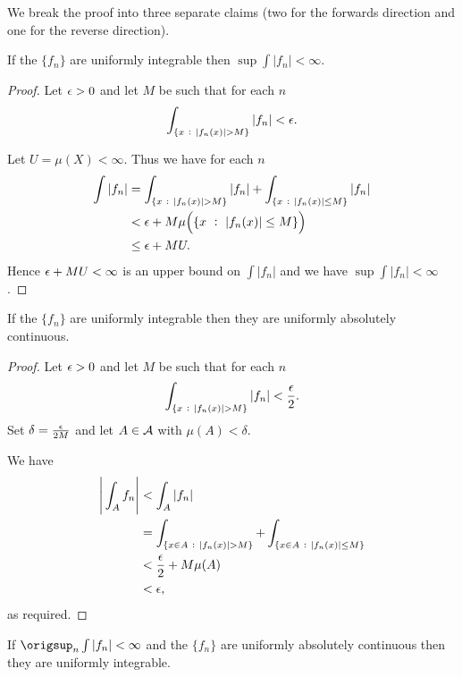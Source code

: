 We break the proof into three separate claims (two for the forwards direction and one for the reverse direction).

\begin{claim*}
  If the $\{f_n\}$ are uniformly integrable then $\sup \int |f_n| < \infty$.
\end{claim*}

\begin{proof}
  Let $\epsilon > 0$ and let $M$ be such that for each $n$
  \begin{align*}
    \int_{\{x ~:~ |f_n(x)| > M\}} |f_n| < \epsilon.
  \end{align*}

  Let $U = \mu(X) < \infty$. Thus we have for each $n$
  \begin{align*}
    \int |f_n|
    &= \int_{\{x ~:~ |f_n(x)| > M\}} |f_n| + \int_{\{x ~:~ |f_n(x)| \leq M\}} |f_n| \\
    &< \epsilon +  M \mu\Big(\{x ~:~ |f_n(x)| \leq M\}\Big) \\
    &\leq \epsilon + MU.
  \end{align*}
  Hence $\epsilon + MU < \infty$ is an upper bound on $\int |f_n|$ and we have $\sup \int |f_n| < \infty$.
\end{proof}

\begin{claim*}
  If the $\{f_n\}$ are uniformly integrable then they are uniformly absolutely continuous.
\end{claim*}

\begin{proof}
  Let $\epsilon > 0$ and let $M$ be such that for each $n$
  \begin{align*}
    \int_{\{x ~:~ |f_n(x)| > M\}} |f_n| < \frac{\epsilon}{2}.
  \end{align*}
  Set $\delta = \frac{\epsilon}{2M}$ and let $A \in \mathcal A$ with $\mu(A) < \delta$.

  We have
  \begin{align*}
    \Bigg|\int_A f_n\Bigg|
    &< \int_A |f_n| \\
    &= \int_{\{x \in A ~:~ |f_n(x)| > M\}} + \int_{\{x \in A ~:~ |f_n(x)| \leq M\}} \\
    &< \frac{\epsilon}{2} + M\mu(A) \\
    &< \epsilon,
  \end{align*}
  as required.
\end{proof}

\begin{claim*}
  If $\origsup_n \int |f_n| < \infty$ and the $\{f_n\}$ are uniformly absolutely continuous then they are
  uniformly integrable.
\end{claim*}


